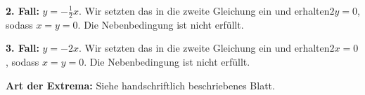\documentclass[a4paper]{article}
\renewcommand{\hline}{\noindent\makebox[\linewidth]{\rule{12cm}{1pt}}}
\begin{document}
\textbf{2. Fall:} $y = -\frac{1}{2}x$. Wir setzten das in die zweite Gleichung ein und erhalten$2y = 0$, sodass $x = y = 0$. Die Nebenbedingung ist nicht erfüllt.

\textbf{3. Fall:} $y = -2x$. Wir setzten das in die zweite Gleichung ein und erhalten$2x = 0$, sodass $x = y = 0$. Die Nebenbedingung ist nicht erfüllt.

\hline 

\textbf{Art der Extrema:} Siehe handschriftlich beschriebenes Blatt.
\end{document}
